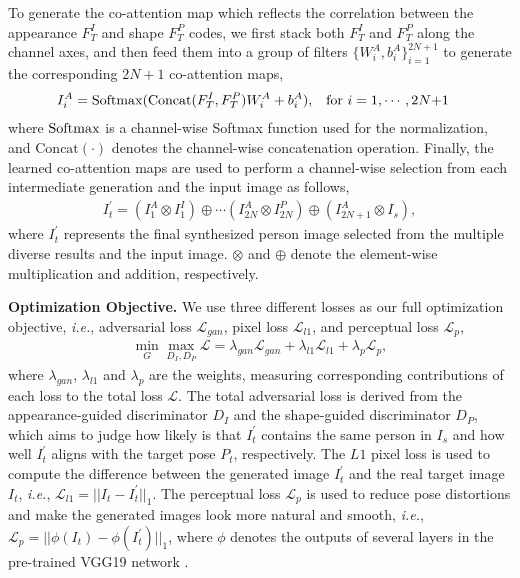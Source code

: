 \documentclass[runningheads]{llncs}
\begin{document}
To generate the co-attention map which reflects the correlation between the appearance $F_T^I$ and shape $F_T^P$ codes, we first stack both $F_T^I$ and $F_T^P$ along the channel axes, and then feed them into a group of filters $\{W_i^A, b_i^A\}_{i=1}^{2N+1}$ to generate the corresponding $2N{+}1$ co-attention maps,
\begin{equation}
\begin{aligned}
I_i^A =  {\rm Softmax}({\rm Concat}(F_T^I, F_T^P) W_i^A +b_i^A),  & \quad   {\rm for}~i  =  1, \cdots, 2N{+}1 
\end{aligned}
\end{equation}
where ${\rm Softmax}$ is a channel-wise Softmax function used for the normalization, and $\mathrm{Concat}(\cdot)$ denotes the channel-wise concatenation operation.
Finally, the learned co-attention maps are used to perform a channel-wise selection from each intermediate generation and the input image as follows,
\begin{equation}
\begin{aligned}
I_t^{'} = (I_1^A \otimes I_1^I) \oplus \cdots (I_{2N}^A \otimes I_{2N}^P)  \oplus (I_{2N+1}^A \otimes I_s),
\end{aligned}
\end{equation}
where $I_t^{'}$ represents the final synthesized person image selected from the multiple diverse results and the input image. $\otimes$ and $\oplus$ denote the element-wise multiplication and addition, respectively. 

\noindent \textbf{Optimization Objective.}
We use three different losses as our full optimization objective, \emph{i.e.}, adversarial loss $\mathcal{L}_{gan}$, pixel loss $\mathcal{L}_{l1}$, and perceptual loss $\mathcal{L}_{p}$,
\begin{equation}
\begin{aligned}
\min_G \max_{D_I, D_P}  \mathcal{L} = \lambda_{gan} \mathcal{L}_{gan} + \lambda_{l1} \mathcal{L}_{l1} + \lambda_{p} \mathcal{L}_{p},
\label{eq:loss} 
\end{aligned}
\end{equation}
where $\lambda_{gan}$, $\lambda_{l1}$ and $\lambda_{p}$ are the weights, measuring corresponding contributions of each loss to the total loss $\mathcal{L}$.
The total adversarial loss is derived from the appearance-guided discriminator $D_I$ and the shape-guided discriminator $D_P$, which aims to judge how likely is that $I_t^{'}$ contains the same person in $I_s$ and how well $I_t^{'}$ aligns with the target pose $P_t$, respectively.
The $L1$ pixel loss is used to compute the difference between the generated image $I_t^{'}$ and the real target image $I_t$, \emph{i.e.}, $\mathcal{L}_{l1}{=} \vert\vert I_t-I_t^{'}\vert\vert_1$.
The perceptual loss $\mathcal{L}_{p}$ is used to reduce pose distortions and make the generated images look more natural and smooth, \emph{i.e.}, $\mathcal{L}_{p}{=}\vert\vert \phi(I_t)-\phi(I_t^{'})\vert\vert_1$, where $\phi$ denotes the outputs of several layers in the pre-trained VGG19 network \cite{simonyan2014very}.
\end{document}
